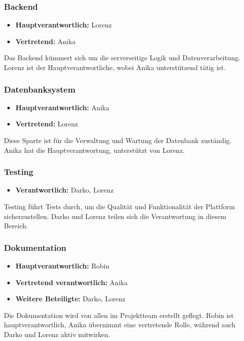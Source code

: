 \subsubsection{Backend}
\begin{itemize}
    \item \textbf{Hauptverantwortlich:} Lorenz
    \item \textbf{Vertretend:} Anika
\end{itemize}
Das Backend kümmert sich um die serverseitige Logik und Datenverarbeitung.
Lorenz ist der Hauptverantwortliche, wobei Anika unterstützend tätig ist.

\subsubsection{Datenbanksystem}
\begin{itemize}
    \item \textbf{Hauptverantwortlich:} Anika
    \item \textbf{Vertretend:} Lorenz
\end{itemize}
Diese Sparte ist für die Verwaltung und Wartung der Datenbank zuständig.
Anika hat die Hauptverantwortung, unterstützt von Lorenz.

\subsubsection{Testing}
\begin{itemize}
    \item \textbf{Verantwortlich:} Darko, Lorenz
\end{itemize}
Testing führt Tests durch, um die Qualität und Funktionalität der Plattform sicherzustellen.
Darko und Lorenz teilen sich die Verantwortung in diesem Bereich.

\subsubsection{Dokumentation}
\begin{itemize}
    \item \textbf{Hauptverantwortlich:} Robin
    \item \textbf{Vertretend verantwortlich:} Anika
    \item \textbf{Weitere Beteiligte:} Darko, Lorenz
\end{itemize}
Die Dokumentation wird von allen im Projektteam erstellt geflegt.
Robin ist hauptverantwortlich, Anika übernimmt eine vertretende Rolle, während auch Darko und Lorenz aktiv mitwirken.

